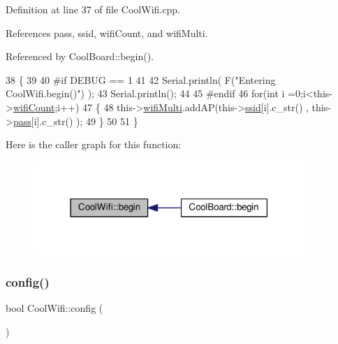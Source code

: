 Definition at line 37 of file Cool\+Wifi.\+cpp.



References pass, ssid, wifi\+Count, and wifi\+Multi.



Referenced by Cool\+Board\+::begin().


\begin{DoxyCode}
38 \{ 
39 
40 \textcolor{preprocessor}{#if DEBUG == 1 }
41 
42     Serial.println( F(\textcolor{stringliteral}{"Entering CoolWifi.begin()"}) );
43     Serial.println();
44 
45 \textcolor{preprocessor}{#endif}
46     \textcolor{keywordflow}{for}(\textcolor{keywordtype}{int} i =0;i<this->\hyperlink{classCoolWifi_ab133bd92fcb895b884deecd6678592e4}{wifiCount};i++)
47     \{
48          this->\hyperlink{classCoolWifi_a7862a8c0d7239877e2956c14a368aab8}{wifiMulti}.addAP(this->\hyperlink{classCoolWifi_a893b21d0fed821438733bba2e73fb4c2}{ssid}[i].c\_str() , this->\hyperlink{classCoolWifi_a0c3332a149245aaad060b32593a54c9b}{pass}[i].c\_str() );    
49     \}
50     
51 \}
\end{DoxyCode}
Here is the caller graph for this function\+:\nopagebreak
\begin{figure}[H]
\begin{center}
\leavevmode
\includegraphics[width=291pt]{classCoolWifi_a46942fed90e475112cc10b78a32e7aaa_icgraph}
\end{center}
\end{figure}
\mbox{\label{classCoolWifi_a4eb2f6b9b09dd588964b88b6c70122c0}} 
\subsubsection{\texorpdfstring{config()}{config()}\hspace{0.1cm}{\footnotesize\ttfamily [1/2]}}
{\footnotesize\ttfamily bool Cool\+Wifi\+::config (\begin{DoxyParamCaption}{ }\end{DoxyParamCaption})}

